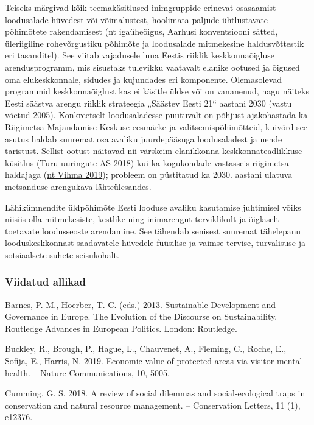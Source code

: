\documentclass[estonian,]{article}
\begin{document}
Teiseks märgivad kõik teemakäsitlused inimgruppide erinevat osasaamist loodusalade hüvedest või võimalustest, hoolimata paljude ühtlustavate põhimõtete rakendamisest (nt igaüheõigus, Aarhusi konventsiooni sätted, üleriigiline rohevõrgustiku põhimõte ja loodusalade mitmekesine haldusvõttestik eri tasanditel). See viitab vajadusele luua Eestis riiklik keskkonnaõigluse arendusprogramm, mis sisustaks tulevikku vaatavalt elanike ootused ja õigused oma elukeskkonnale, sidudes ja kujundades eri komponente. Olemasolevad programmid keskkonnaõiglust kas ei käsitle üldse või on vananenud, nagu näiteks Eesti säästva arengu riiklik strateegia „Säästev Eesti 21`` aastani 2030 (vastu võetud 2005). Konkreetselt loodusaladesse puutuvalt on põhjust ajakohastada ka Riigimetsa Majandamise Keskuse eesmärke ja valitsemispõhimõtteid, kuivõrd see asutus haldab suuremat osa avaliku juurdepääsuga loodusaladest ja nende taristust. Sellist ootust näitavad nii värskeim elanikkonna keskkonnateadlikkuse küsitlus (\protect\hyperlink{Turu-uuringute2018}{Turu-uuringute AS 2018}) kui ka kogukondade vastasseis riigimetsa haldajaga (\protect\hyperlink{Vihma2019}{nt Vihma 2019}); probleem on püstitatud ka 2030. aastani ulatuva metsanduse arengukava lähteülesandes.

Lähikümnendite üldpõhimõte Eesti looduse avaliku kasutamise juhtimisel võiks niisiis olla mitmekesiste, kestlike ning inimarengut terviklikult ja õiglaselt toetavate loodusseoste arendamine. See tähendab senisest suuremat tähelepanu looduskeskkonnast saadavatele hüvedele füüsilise ja vaimse tervise, turvalisuse ja sotsiaalsete suhete seisukohalt.

\hypertarget{viidatud-allikad-11}{%
\subsubsection*{Viidatud allikad}\label{viidatud-allikad-11}}

Barnes, P. M., Hoerber, T. C. (eds.) 2013. Sustainable Development and Governance in Europe. The Evolution of the Discourse on Sustainability. Routledge Advances in European Politics. London: Routledge.

Buckley, R., Brough, P., Hague, L., Chauvenet, A., Fleming, C., Roche, E., Sofija, E., Harris, N. 2019. Economic value of protected areas via visitor mental health. -- Nature Communications, 10, 5005.

Cumming, G. S. 2018. A review of social dilemmas and social‐ecological traps in conservation and natural resource management. -- Conservation Letters, 11 (1), e12376.
\end{document}
